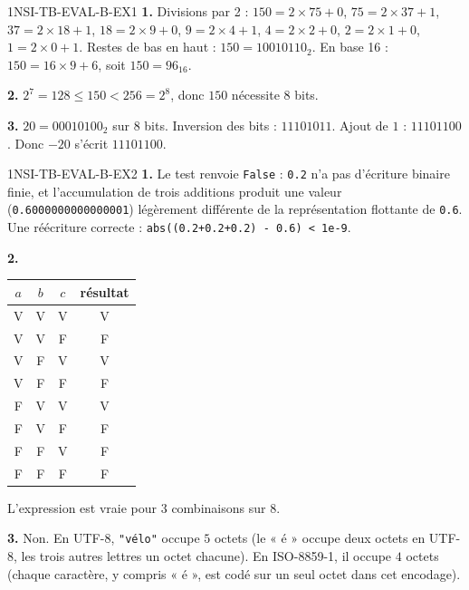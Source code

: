 \begin{corrige}{1NSI-TB-EVAL-B-EX1}
\textbf{1.} Divisions par 2 : $150=2\times75+0$, $75=2\times37+1$, $37=2\times18+1$,
$18=2\times9+0$, $9=2\times4+1$, $4=2\times2+0$, $2=2\times1+0$, $1=2\times0+1$. Restes de
bas en haut : $150=10010110_2$. En base 16 : $150=16\times9+6$, soit $150=96_{16}$.

\textbf{2.} $2^7=128\leqslant150<256=2^8$, donc $150$ nécessite $8$ bits.

\textbf{3.} $20=00010100_2$ sur 8 bits. Inversion des bits : $11101011$. Ajout de $1$ :
$11101100$. Donc $-20$ s'écrit $11101100$.
\end{corrige}

\begin{corrige}{1NSI-TB-EVAL-B-EX2}
\textbf{1.} Le test renvoie \lstinline{False} : \lstinline{0.2} n'a pas d'écriture binaire
finie, et l'accumulation de trois additions produit une valeur
(\lstinline{0.6000000000000001}) légèrement différente de la représentation flottante de
\lstinline{0.6}. Une réécriture correcte : \lstinline{abs((0.2+0.2+0.2) - 0.6) < 1e-9}.

\textbf{2.}
\begin{center}
\begin{tabular}{ccc|c}
  $a$ & $b$ & $c$ & résultat \\\hline
  V & V & V & V \\
  V & V & F & F \\
  V & F & V & V \\
  V & F & F & F \\
  F & V & V & V \\
  F & V & F & F \\
  F & F & V & F \\
  F & F & F & F \\
\end{tabular}
\end{center}
L'expression est vraie pour $3$ combinaisons sur $8$.

\textbf{3.} Non. En UTF-8, \lstinline{"vélo"} occupe $5$ octets (le « é » occupe deux
octets en UTF-8, les trois autres lettres un octet chacune). En ISO-8859-1, il occupe
$4$ octets (chaque caractère, y compris « é », est codé sur un seul octet dans cet
encodage).
\end{corrige}
